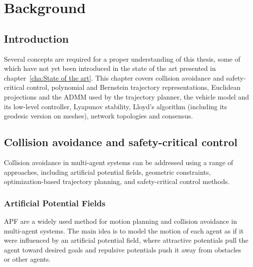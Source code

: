 
%

\chapter{Background}
\label{cha:Background}

\glsresetall

\section{Introduction}
\label{sec.3:Introduction}

Several concepts are required for a proper understanding of this thesis, some of which have not yet been introduced in the state of the art presented in chapter~\ref{cha:State of the art}. This chapter covers collision avoidance and safety-critical control, polynomial and Bernstein trajectory representations, Euclidean projections and the \gls{ADMM} used by the trajectory planner, the vehicle model and its low-level controller, Lyapunov stability, Lloyd's algorithm (including its geodesic version on meshes), network topologies and consensus.

\section{Collision avoidance and safety-critical control}

Collision avoidance in multi-agent systems can be addressed using a range of approaches, including artificial potential fields, geometric constraints, optimization-based trajectory planning, and safety-critical control methods.

\subsection{Artificial Potential Fields} \label{sec.3:Artificial Potential Fields}

\gls{APF} are a widely used method for motion planning
and collision avoidance in multi-agent systems. The main idea is to model the
motion of each agent as if it were influenced by an artificial potential field,
where attractive potentials pull the agent toward desired goals and repulsive
potentials push it away from obstacles or other agents.

